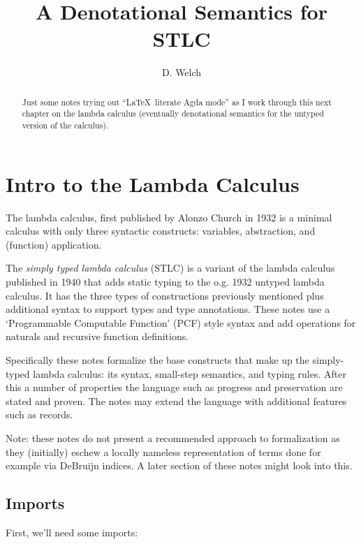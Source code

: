 \documentclass[runningheads]{llncs}
\begin{document}
\title{A Denotational Semantics for STLC}
\author{D. Welch}
\institute{}
\maketitle

\begin{abstract}
Just some notes trying out ``\LaTeX \ literate Agda mode'' as I work through 
this next chapter on the lambda calculus (eventually denotational semantics for
the untyped version of the calculus).
\end{abstract}

\section{Intro to the Lambda Calculus} 

The lambda calculus, first published by Alonzo Church in 1932 is a minimal calculus
with only three syntactic constructs: variables, abstraction, and (function) 
application. 

The \textit{simply typed lambda calculus} (STLC) is a variant of the lambda calculus
published in 1940 that adds static typing to the o.g. 1932 untyped lambda calculus. It 
has the three types of constructions previously mentioned plus additional syntax to support 
types and type annotations. These notes use a `Programmable Computable Function' (PCF)
style syntax and add operations for naturals and recursive function definitions.

Specifically these notes formalize the base constructs that make up the simply-typed lambda 
calculus: its syntax, small-step semantics, and typing rules. After this a number
of properties the language such as progress and preservation are stated and proven. The notes
may extend the language with additional features such as records.

Note: these notes do not present a recommended approach to formalization as they (initially)
eschew a locally nameless representation of terms done for example via DeBruijn indices. A 
later section of these notes might look into this. 

\subsection{Imports}

First, we'll need some imports:
\end{document}
